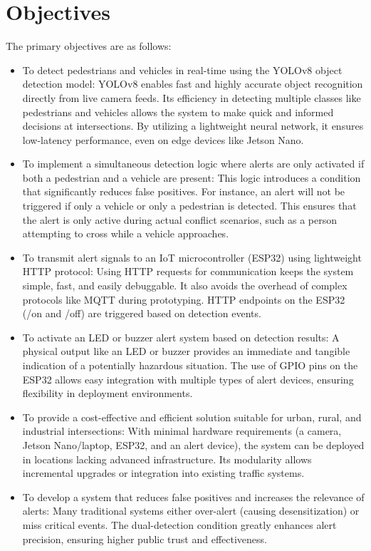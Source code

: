 \documentclass[a4paper, 12pt]{report}
\begin{document}
\section{Objectives}
 
The primary objectives are as follows:

\begin{itemize}[itemsep=-4pt]
    \item 
        To detect pedestrians and vehicles in real-time using the YOLOv8 object detection model:
YOLOv8 enables fast and highly accurate object recognition directly from live camera feeds. Its efficiency in detecting multiple classes like pedestrians and vehicles allows the system to make quick and informed decisions at intersections. By utilizing a lightweight neural network, it ensures low-latency performance, even on edge devices like Jetson Nano.
    \item 
        To implement a simultaneous detection logic where alerts are only activated if both a pedestrian and a vehicle are present:
This logic introduces a condition that significantly reduces false positives. For instance, an alert will not be triggered if only a vehicle or only a pedestrian is detected. This ensures that the alert is only active during actual conflict scenarios, such as a person attempting to cross while a vehicle approaches.
    \item 
        To transmit alert signals to an IoT microcontroller (ESP32) using lightweight HTTP protocol:
Using HTTP requests for communication keeps the system simple, fast, and easily debuggable. It also avoids the overhead of complex protocols like MQTT during prototyping. HTTP endpoints on the ESP32 (/on and /off) are triggered based on detection events.
    \item 
       To activate an LED or buzzer alert system based on detection results:
A physical output like an LED or buzzer provides an immediate and tangible indication of a potentially hazardous situation. The use of GPIO pins on the ESP32 allows easy integration with multiple types of alert devices, ensuring flexibility in deployment environments.
    \item 
        To provide a cost-effective and efficient solution suitable for urban, rural, and industrial intersections:
With minimal hardware requirements (a camera, Jetson Nano/laptop, ESP32, and an alert device), the system can be deployed in locations lacking advanced infrastructure. Its modularity allows incremental upgrades or integration into existing traffic systems.
    \item 
       To develop a system that reduces false positives and increases the relevance of alerts:
Many traditional systems either over-alert (causing desensitization) or miss critical events. The dual-detection condition greatly enhances alert precision, ensuring higher public trust and effectiveness.
    


\end{itemize}
\end{document}
